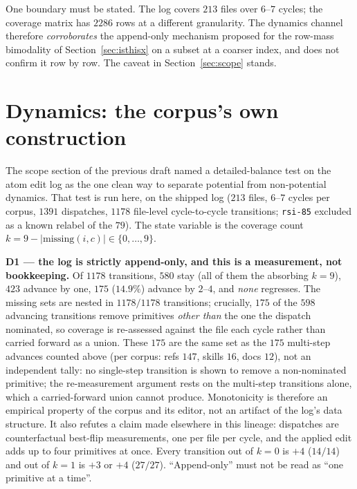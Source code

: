 \documentclass[11pt,a4paper]{article}
\theoremstyle{plain}
\theoremstyle{remark}
\theoremstyle{plain}
\begin{document}
One boundary must be stated. The log covers $213$ files over $6$--$7$ cycles; the
coverage matrix has $2286$ rows at a different granularity. The dynamics channel
therefore \emph{corroborates} the append-only mechanism proposed for the row-mass
bimodality of Section~\ref{sec:isthisx} on a subset at a coarser index, and does
not confirm it row by row. The caveat in Section~\ref{sec:scope} stands.

\section{Dynamics: the corpus's own construction}
\label{sec:dynamics}

The scope section of the previous draft named a detailed-balance test on the atom
edit log as the one clean way to separate potential from non-potential dynamics.
That test is run here, on the shipped log ($213$ files, $6$--$7$ cycles per corpus,
$1391$ dispatches, $1178$ file-level cycle-to-cycle transitions; \texttt{rsi-85}
excluded as a known relabel of the $79$). The state variable is the coverage count
$k=9-|\mathrm{missing}(i,c)|\in\{0,\dots,9\}$.

\textbf{D1 --- the log is strictly append-only, and this is a measurement, not
bookkeeping.} Of $1178$ transitions, $580$ stay (all of them the absorbing $k=9$),
$423$ advance by one, $175$ ($14.9\%$) advance by $2$--$4$, and \emph{none}
regresses. The missing sets are nested in $1178/1178$ transitions; crucially,
$175$ of the $598$ advancing transitions remove primitives \emph{other than} the one the dispatch nominated, so coverage is re-assessed against the file each cycle rather than carried forward as a union. These $175$ are the same set as the $175$ multi-step advances counted above (per corpus: refs $147$, skills $16$, docs $12$), not an independent tally: no single-step transition is shown to remove a non-nominated primitive; the re-measurement argument rests on the multi-step transitions alone, which a carried-forward union cannot produce. Monotonicity is therefore an empirical
property of the corpus and its editor, not an artifact of the log's data
structure. It also refutes a claim made elsewhere in this lineage: dispatches are
counterfactual best-flip measurements, one per file per cycle, and the applied
edit adds up to four primitives at once. Every transition out of $k=0$ is $+4$
($14/14$) and out of $k=1$ is $+3$ or $+4$ ($27/27$). ``Append-only'' must not be
read as ``one primitive at a time''.
\end{document}
